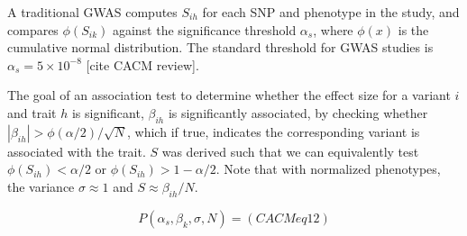 \documentclass{article}
\newcommand{\mb}[1]{\mathbf{#1}}
\begin{document}
A traditional GWAS computes $S_{ih}$ for each SNP and phenotype in the study, and compares $\phi(S_{ik})$ against the significance threshold $\alpha_s$, where $\phi(x)$ is the cumulative normal distribution. The standard threshold for GWAS studies is $\alpha_s = 5 \times 10^{-8}$ [cite CACM review].

The goal of an association test to determine whether the effect size for a variant $i$ and trait $h$ is significant, $\beta_{ih}$ is significantly associated, by checking whether $|\beta_{ih}| > \phi(\alpha/2)/\sqrt{N}$, which if true, indicates the corresponding variant is associated with the trait. $S$ was derived such that we can equivalently test $\phi(S_{ih}) < \alpha/2$ or $\phi(S_{ih}) > 1 - \alpha/2$. Note that with normalized phenotypes, the variance $\sigma \approx 1$ and $S \approx \beta_{ih}/N$.

\[P(\alpha_s, \beta_k, \sigma, N) = (CACM eq 12)\]


	
	
	
\end{document}
